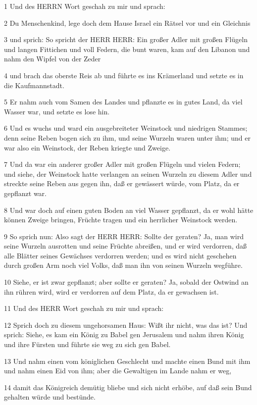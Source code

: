 \par 1 Und des HERRN Wort geschah zu mir und sprach:
\par 2 Du Menschenkind, lege doch dem Hause Israel ein Rätsel vor und ein Gleichnis
\par 3 und sprich: So spricht der HERR HERR: Ein großer Adler mit großen Flügeln und langen Fittichen und voll Federn, die bunt waren, kam auf den Libanon und nahm den Wipfel von der Zeder
\par 4 und brach das oberste Reis ab und führte es ins Krämerland und setzte es in die Kaufmannstadt.
\par 5 Er nahm auch vom Samen des Landes und pflanzte es in gutes Land, da viel Wasser war, und setzte es lose hin.
\par 6 Und es wuchs und ward ein ausgebreiteter Weinstock und niedrigen Stammes; denn seine Reben bogen sich zu ihm, und seine Wurzeln waren unter ihm; und er war also ein Weinstock, der Reben kriegte und Zweige.
\par 7 Und da war ein anderer großer Adler mit großen Flügeln und vielen Federn; und siehe, der Weinstock hatte verlangen an seinen Wurzeln zu diesem Adler und streckte seine Reben aus gegen ihn, daß er gewässert würde, vom Platz, da er gepflanzt war.
\par 8 Und war doch auf einen guten Boden an viel Wasser gepflanzt, da er wohl hätte können Zweige bringen, Früchte tragen und ein herrlicher Weinstock werden.
\par 9 So sprich nun: Also sagt der HERR HERR: Sollte der geraten? Ja, man wird seine Wurzeln ausrotten und seine Früchte abreißen, und er wird verdorren, daß alle Blätter seines Gewächses verdorren werden; und es wird nicht geschehen durch großen Arm noch viel Volks, daß man ihn von seinen Wurzeln wegführe.
\par 10 Siehe, er ist zwar gepflanzt; aber sollte er geraten? Ja, sobald der Ostwind an ihn rühren wird, wird er verdorren auf dem Platz, da er gewachsen ist.
\par 11 Und des HERR Wort geschah zu mir und sprach:
\par 12 Sprich doch zu diesem ungehorsamen Haus: Wißt ihr nicht, was das ist? Und sprich: Siehe, es kam ein König zu Babel gen Jerusalem und nahm ihren König und ihre Fürsten und führte sie weg zu sich gen Babel.
\par 13 Und nahm einen vom königlichen Geschlecht und machte einen Bund mit ihm und nahm einen Eid von ihm; aber die Gewaltigen im Lande nahm er weg,
\par 14 damit das Königreich demütig bliebe und sich nicht erhöbe, auf daß sein Bund gehalten würde und bestünde.
